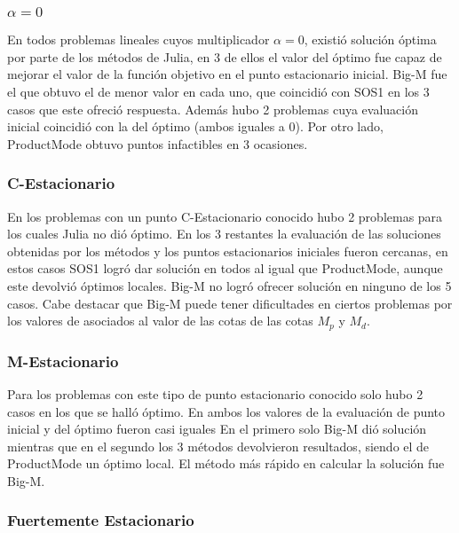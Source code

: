 \subsubsection{$\alpha =0$}

En todos problemas lineales cuyos multiplicador $\alpha=0$, existió solución óptima 
por parte de los métodos de Julia, en 3 de ellos el valor del óptimo fue capaz de mejorar el valor de la función objetivo en el punto estacionario inicial. Big-M fue el que obtuvo el de menor valor en cada uno, que coincidió con SOS1 en los 3 casos que este ofreció respuesta. Además hubo 2 problemas cuya evaluación inicial coincidió con la del óptimo (ambos iguales a 0). Por otro lado, ProductMode obtuvo puntos infactibles en 3 ocasiones. 




\subsubsection{C-Estacionario}

En los problemas con un punto C-Estacionario conocido hubo 2 problemas para los cuales Julia no dió óptimo. En los 3 restantes la evaluación de las soluciones obtenidas por los métodos  y los puntos estacionarios iniciales fueron cercanas, en estos casos SOS1 logró dar solución en todos al igual que ProductMode, aunque este devolvió óptimos locales. Big-M no logró ofrecer solución en ninguno de los 5 casos. Cabe destacar que Big-M puede tener dificultades en ciertos problemas por los valores de asociados al valor de las cotas de las cotas $M_p$ y $M_d$.



\subsubsection{M-Estacionario}

Para los problemas con este tipo de punto estacionario conocido solo hubo 2 casos en los que se halló óptimo.
En ambos los valores de la evaluación de punto inicial y del óptimo fueron casi iguales 
En el primero solo Big-M dió solución mientras que en el segundo los 3 métodos devolvieron resultados, 
siendo el de ProductMode un óptimo local. El método más rápido en calcular la solución fue Big-M.

  
\subsubsection{Fuertemente Estacionario}

